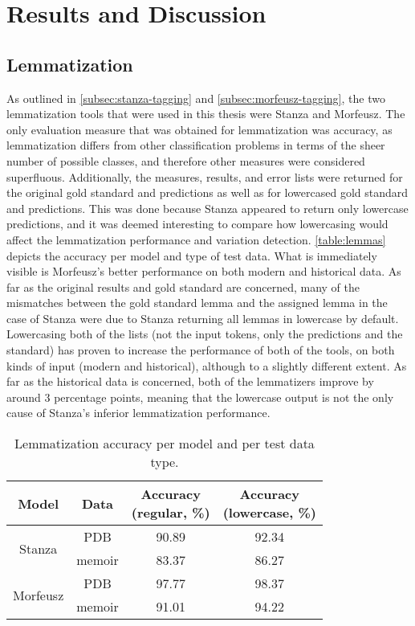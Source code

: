 \section{Results and Discussion}
\label{sec:results}

\subsection{Lemmatization}
\label{subsec:lemmatization}

As outlined in \autoref{subsec:stanza-tagging} and \autoref{subsec:morfeusz-tagging}, the two lemmatization tools that were used in this thesis were Stanza and Morfeusz. The only evaluation measure that was obtained for lemmatization was accuracy, as lemmatization differs from other classification problems in terms of the sheer number of possible classes, and therefore other measures were considered superfluous. Additionally, the measures, results, and error lists were returned for the original gold standard and predictions as well as for lowercased gold standard and predictions. This was done because Stanza appeared to return only lowercase predictions, and it was deemed interesting to compare how lowercasing would affect the lemmatization performance and variation detection. \autoref{table:lemmas} depicts the accuracy per model and type of test data. What is immediately visible is Morfeusz's better performance on both modern and historical data. As far as the original results and gold standard are concerned, many of the mismatches between the gold standard lemma and the assigned lemma in the case of Stanza were due to Stanza returning all lemmas in lowercase by default. Lowercasing both of the lists (not the input tokens, only the predictions and the standard) has proven to increase the performance of both of the tools, on both kinds of input (modern and historical), although to a slightly different extent. As far as the historical data is concerned, both of the lemmatizers improve by around 3 percentage points, meaning that the lowercase output is not the only cause of Stanza's inferior lemmatization performance.  \\

\renewcommand{\arraystretch}{1.25}
\begin{table}[h]
\begin{center}
\begin{tabular}{|cc|c|c|}
\hline \bf Model & \bf Data & \bf \makecell[c]{Accuracy \\ (regular, \%)} & \bf \makecell[c]{Accuracy \\ (lowercase, \%)} \\ \hline
\multirow{2}{4em}{Stanza}
& PDB & 90.89 & 92.34  \\
& memoir & 83.37 & 86.27  \\
\multirow{2}{4em}{Morfeusz}
& PDB & 97.77 & 98.37  \\
& memoir & 91.01 & 94.22 \\ 
\hline
\end{tabular}
\caption{\label{table:lemmas} Lemmatization accuracy per model and per test data type.}
\end{center}
\end{table}

